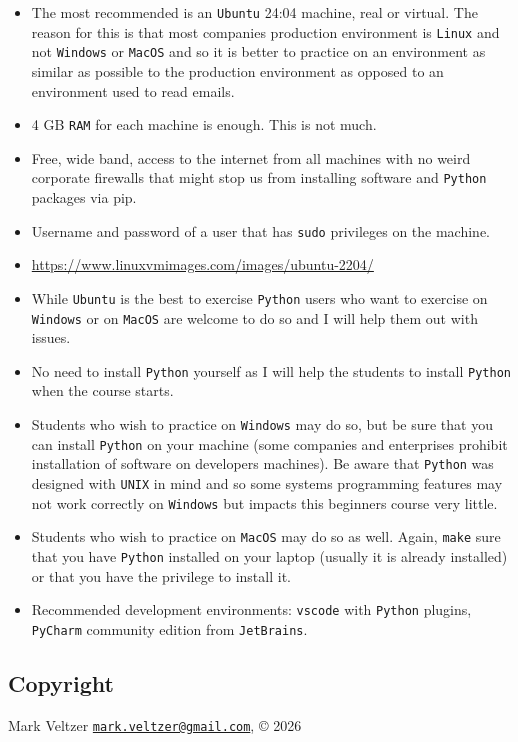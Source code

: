 \documentclass[
]{article}
\providecommand{\tightlist}{%
  \setlength{\itemsep}{0pt}\setlength{\parskip}{0pt}}
\begin{document}
\begin{itemize}
\tightlist
\item
  The most recommended is an \texttt{Ubuntu} 24:04 machine, real or
  virtual. The reason for this is that most companies production
  environment is \texttt{Linux} and not \texttt{Windows} or
  \texttt{MacOS} and so it is better to practice on an environment as
  similar as possible to the production environment as opposed to an
  environment used to read emails.
\item
  4 GB \texttt{RAM} for each machine is enough. This is not much.
\item
  Free, wide band, access to the internet from all machines with no
  weird corporate firewalls that might stop us from installing software
  and \texttt{Python} packages via pip.
\item
  Username and password of a user that has \texttt{sudo} privileges on
  the machine.
\item
  \url{https://www.linuxvmimages.com/images/ubuntu-2204/}
\item
  While \texttt{Ubuntu} is the best to exercise \texttt{Python} users
  who want to exercise on \texttt{Windows} or on \texttt{MacOS} are
  welcome to do so and I will help them out with issues.
\item
  No need to install \texttt{Python} yourself as I will help the
  students to install \texttt{Python} when the course starts.
\item
  Students who wish to practice on \texttt{Windows} may do so, but be
  sure that you can install \texttt{Python} on your machine (some
  companies and enterprises prohibit installation of software on
  developers machines). Be aware that \texttt{Python} was designed with
  \texttt{UNIX} in mind and so some systems programming features may not
  work correctly on \texttt{Windows} but impacts this beginners course
  very little.
\item
  Students who wish to practice on \texttt{MacOS} may do so as well.
  Again, \texttt{make} sure that you have \texttt{Python} installed on
  your laptop (usually it is already installed) or that you have the
  privilege to install it.
\item
  Recommended development environments: \texttt{vscode} with
  \texttt{Python} plugins, \texttt{PyCharm} community edition from
  \texttt{JetBrains}.
\end{itemize}

\subsection{Copyright}\label{copyright}

Mark Veltzer
\href{mailto:mark.veltzer@gmail.com}{\nolinkurl{mark.veltzer@gmail.com}},
© 2026
\end{document}
